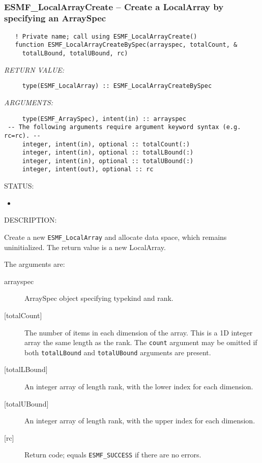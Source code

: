  
\mbox{}\hrulefill\ 
 
\subsubsection [ESMF\_LocalArrayCreate] {ESMF\_LocalArrayCreate -- Create a LocalArray by specifying an ArraySpec}


\begin{verbatim}   ! Private name; call using ESMF_LocalArrayCreate()
   function ESMF_LocalArrayCreateBySpec(arrayspec, totalCount, &
     totalLBound, totalUBound, rc)\end{verbatim}{\em RETURN VALUE:}
\begin{verbatim}     type(ESMF_LocalArray) :: ESMF_LocalArrayCreateBySpec\end{verbatim}{\em ARGUMENTS:}
\begin{verbatim}     type(ESMF_ArraySpec), intent(in) :: arrayspec
 -- The following arguments require argument keyword syntax (e.g. rc=rc). --
     integer, intent(in), optional :: totalCount(:)
     integer, intent(in), optional :: totalLBound(:)
     integer, intent(in), optional :: totalUBound(:)
     integer, intent(out), optional :: rc\end{verbatim}
{\sf STATUS:}
   \begin{itemize}
   \item{}
   \end{itemize}
  
{\sf DESCRIPTION:\\ }


   Create a new {\tt ESMF\_LocalArray} and allocate data space, which remains
   uninitialized. The return value is a new LocalArray.
  
   The arguments are:
   \begin{description}
   \item[arrayspec]
   ArraySpec object specifying typekind and rank.
   \item[{[totalCount]}]
   The number of items in each dimension of the array. This is a 1D
   integer array the same length as the rank. The {\tt count} argument may
   be omitted if both {\tt totalLBound} and {\tt totalUBound} arguments are present.
   \item[{[totalLBound]}]
   An integer array of length rank, with the lower index for each dimension.
   \item[{[totalUBound]}]
   An integer array of length rank, with the upper index for each dimension.
   \item[{[rc]}]
   Return code; equals {\tt ESMF\_SUCCESS} if there are no errors.
   \end{description}
   
